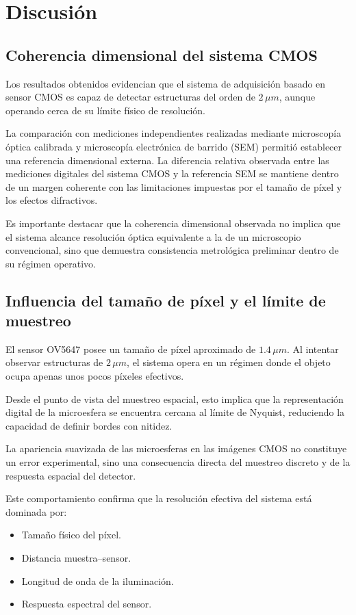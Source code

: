 \chapter{Discusión}

\section{Coherencia dimensional del sistema CMOS}

Los resultados obtenidos evidencian que el sistema de adquisición basado en sensor CMOS es capaz de detectar estructuras del orden de $2\,\mu m$, aunque operando cerca de su límite físico de resolución.

La comparación con mediciones independientes realizadas mediante microscopía óptica calibrada y microscopía electrónica de barrido (SEM) permitió establecer una referencia dimensional externa. La diferencia relativa observada entre las mediciones digitales del sistema CMOS y la referencia SEM se mantiene dentro de un margen coherente con las limitaciones impuestas por el tamaño de píxel y los efectos difractivos.

Es importante destacar que la coherencia dimensional observada no implica que el sistema alcance resolución óptica equivalente a la de un microscopio convencional, sino que demuestra consistencia metrológica preliminar dentro de su régimen operativo.
\section{Influencia del tamaño de píxel y el límite de muestreo}

El sensor OV5647 posee un tamaño de píxel aproximado de $1.4\,\mu m$. Al intentar observar estructuras de $2\,\mu m$, el sistema opera en un régimen donde el objeto ocupa apenas unos pocos píxeles efectivos.

Desde el punto de vista del muestreo espacial, esto implica que la representación digital de la microesfera se encuentra cercana al límite de Nyquist, reduciendo la capacidad de definir bordes con nitidez.

La apariencia suavizada de las microesferas en las imágenes CMOS no constituye un error experimental, sino una consecuencia directa del muestreo discreto y de la respuesta espacial del detector.

Este comportamiento confirma que la resolución efectiva del sistema está dominada por:

\begin{itemize}
    \item Tamaño físico del píxel.
    \item Distancia muestra–sensor.
    \item Longitud de onda de la iluminación.
    \item Respuesta espectral del sensor.
\end{itemize}
